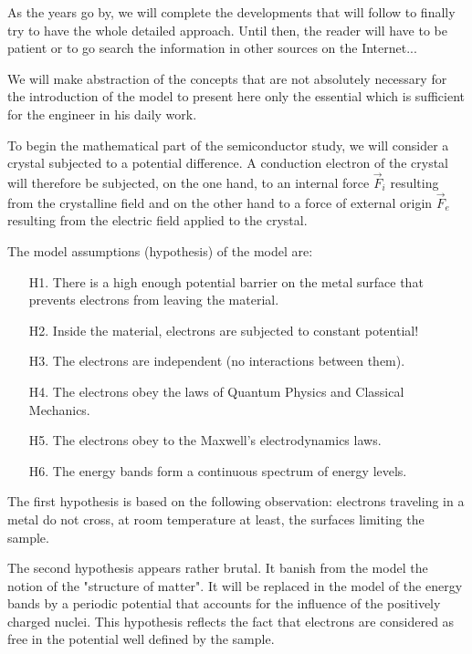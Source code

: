 	As the years go by, we will complete the developments that will follow to finally try to have the whole detailed approach. Until then, the reader will have to be patient or to go search the information in other sources on the Internet...

	We will make abstraction of the concepts that are not absolutely necessary for the introduction of the model to present here only the essential which is sufficient for the engineer in his daily work.

	To begin the mathematical part of the semiconductor study, we will consider a crystal subjected to a potential difference. A conduction electron of the crystal will therefore be subjected, on the one hand, to an internal force $\vec{F}_i$ resulting from the crystalline field and on the other hand to a force of external origin $\vec{F}_e$ resulting from the electric field applied to the crystal.
	
	The model assumptions (hypothesis) of the model are:
	\begin{enumerate}
		\item[H1.] There is a high enough potential barrier on the metal surface that prevents electrons from leaving the material.

		\item[H2.] Inside the material, electrons are subjected to constant potential!

		\item[H3.] The electrons are independent (no interactions between them).

		\item[H4.] The electrons obey the laws of Quantum Physics and Classical Mechanics.

		\item[H5.] The electrons obey to the Maxwell's electrodynamics laws.

		\item[H6.] The energy bands form a continuous spectrum of energy levels.
	\end{enumerate}
	The first hypothesis is based on the following observation: electrons traveling in a metal do not cross, at room temperature at least, the surfaces limiting the sample.

	The second hypothesis appears rather brutal. It banish from the model the notion of the "structure of matter". It will be replaced in the model of the energy bands by a periodic potential that accounts for the influence of the positively charged nuclei. This hypothesis reflects the fact that electrons are considered as free in the potential well defined by the sample.

